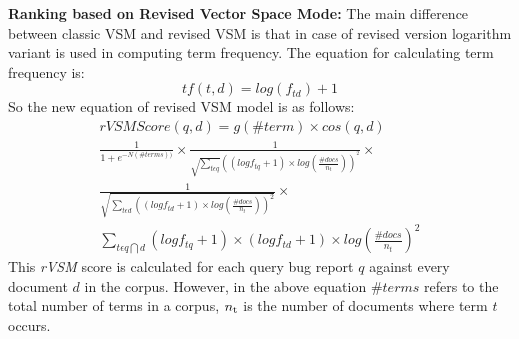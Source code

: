 \documentclass[conference]{IEEEtran}
\begin{document}
\textbf{Ranking based on Revised Vector Space Mode:}
The main difference between classic VSM and revised VSM is that in case of revised version logarithm variant is used in computing term frequency. The equation \cite{Jian} for calculating term frequency is:
\begin{equation}
tf(t,d)=log(f_{td})+1
\end{equation}
So the new equation of revised VSM model is as follows:
\begin{multline}\label{rVSMequation}
rVSMScore(q,d)=g(\#term)\times cos(q,d)
\\
\frac{1}{1+e^{-N(\#terms))}}\times \frac{1}{\sqrt{\sum_{t\epsilon q}}((logf_{tq}+1)\times log(\frac{\#docs}{n_{t}}))^{^{2}}}\times 
\\
\frac{1}{\sqrt{\sum_{t\epsilon d}((log {f_{td}+1})\times log(\frac{\#docs}{n_{t}}))^{2}}}\times
\\
\sum_{t\epsilon q\bigcap d}(logf_{tq}+1)\times (logf_{td}+1)\times log(\frac{\#docs}{n_{t}})^{2}
\end{multline}
This \textit{rVSM} score is calculated for each query bug report {$q$} against every document {$d$} in the corpus. However, in the above equation {$\#terms$} refers to the total number of terms in a corpus, {$n\textsubscript{t}$} is the number of documents where term {$t$} occurs.
\end{document}
